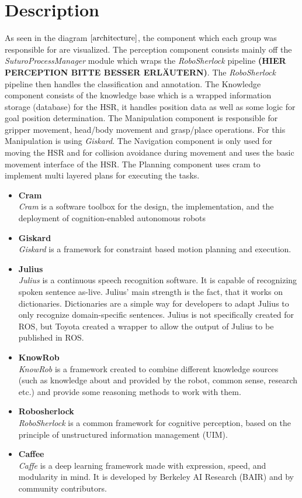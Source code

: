 \documentclass[main.tex]{subfiles}
\begin{document}
		\section{Description}
			As seen in the diagram \(\ref{architecture}\), the component which each group was responsible for are visualized. The perception component consists mainly off the \textit{SuturoProcessManager} module which wraps the \textit{RoboSherlock} pipeline \textbf{(HIER PERCEPTION BITTE BESSER ERLÄUTERN)}. The \textit{RoboSherlock} pipeline then handles the classification and annotation. The Knowledge component consists of the knowledge base which is a wrapped information storage (database) for the HSR, it handles position data as well as some logic for goal position determination. The Manipulation component is responsible for gripper movement, head/body movement and grasp/place operations. For this Manipulation is using \textit{Giskard}. The Navigation component is only used for moving the HSR and for collision avoidance during movement and uses the basic movement interface of the HSR. The Planning component uses cram to implement multi layered plans for executing the tasks.
			\begin{itemize}
				\item{\textbf{Cram}} \\
					 \textit{Cram} is a software toolbox for the design, the implementation, and the deployment of cognition-enabled autonomous robots
				\item{\textbf{Giskard}} \\
					\textit{Giskard} is a  framework for constraint based motion planning and execution.
				\item{\textbf{Julius}} \\
					\textit{Julius} is a continuous speech recognition software. It is capable of recognizing spoken sentence as-live. Julius' main strength is the fact, that it works on dictionaries. Dictionaries are a simple way for developers to adapt Julius to only recognize domain-specific sentences. Julius is not specifically created for ROS, but Toyota created a wrapper to allow the output of Julius to be published in ROS.
				\item{\textbf{KnowRob}} \\
				    \textit{KnowRob} is a framework created to combine different knowledge sources (such as knowledge about and provided by the robot, common sense, research etc.) and provide some reasoning methods to work with them. 
				\item{\textbf{Robosherlock}} \\
					\textit{RoboSherlock} is a common framework for cognitive perception, based on the principle of unstructured information management (UIM).
				\item{\textbf{Caffee}} \\
					\textit{Caffe} is a deep learning framework made with expression, speed, and modularity in mind. It is developed by Berkeley AI Research (BAIR) and by community contributors.

			\end{itemize}
	  		 

	\endgroup
\end{document}
